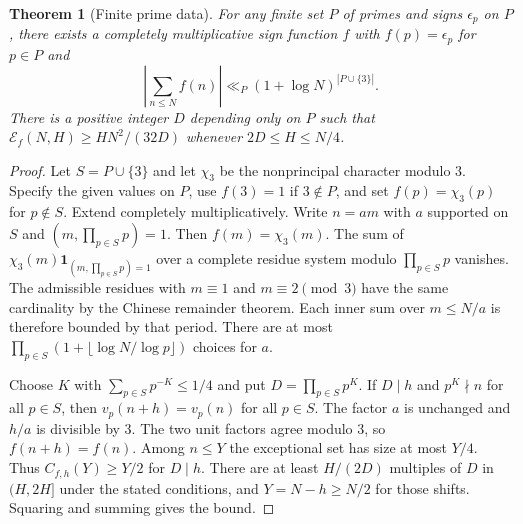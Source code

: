 \documentclass[11pt]{amsart}
\newtheorem{theorem}{Theorem}[section]
\theoremstyle{definition}
\theoremstyle{remark}
\newcommand{\E}{\mathcal E}
\newcommand{\one}{\mathbf 1}
\numberwithin{equation}{section}
\begin{document}
\begin{theorem}[Finite prime data]\label{thm:prime}
For any finite set \(P\) of primes and signs \(\epsilon_p\) on \(P\), there exists a completely multiplicative sign function \(f\) with \(f(p)=\epsilon_p\) for \(p\in P\) and
\[
 \left|\sum_{n\le N} f(n)\right|\ll_P (1+\log N)^{|P\cup\{3\}|}.
\]
There is a positive integer \(D\) depending only on \(P\) such that
\(\E_f(N,H)\ge HN^2/(32D)\) whenever \(2D\le H\le N/4\).
\end{theorem}
\begin{proof}
Let \(S=P\cup\{3\}\) and let \(\chi_3\) be the nonprincipal character modulo \(3\). Specify the given values on \(P\), use \(f(3)=1\) if \(3\notin P\), and set \(f(p)=\chi_3(p)\) for \(p\notin S\). Extend completely multiplicatively. Write \(n=am\) with \(a\) supported on \(S\) and \((m,\prod_{p\in S}p)=1\). Then \(f(m)=\chi_3(m)\). The sum of \(\chi_3(m)\one_{(m,\prod_{p\in S}p)=1}\) over a complete residue system modulo \(\prod_{p\in S}p\) vanishes. The admissible residues with \(m\equiv1\) and \(m\equiv2\pmod 3\) have the same cardinality by the Chinese remainder theorem. Each inner sum over \(m\le N/a\) is therefore bounded by that period. There are at most \(\prod_{p\in S}(1+\lfloor\log N/\log p\rfloor)\) choices for \(a\).

Choose \(K\) with \(\sum_{p\in S}p^{-K}\le1/4\) and put \(D=\prod_{p\in S}p^K\). If \(D\mid h\) and \(p^K\nmid n\) for all \(p\in S\), then \(v_p(n+h)=v_p(n)\) for all \(p\in S\). The factor \(a\) is unchanged and \(h/a\) is divisible by \(3\). The two unit factors agree modulo \(3\), so \(f(n+h)=f(n)\). Among \(n\le Y\) the exceptional set has size at most \(Y/4\). Thus \(C_{f,h}(Y)\ge Y/2\) for \(D\mid h\). There are at least \(H/(2D)\) multiples of \(D\) in \((H,2H]\) under the stated conditions, and \(Y=N-h\ge N/2\) for those shifts. Squaring and summing gives the bound.
\end{proof}
\end{document}
